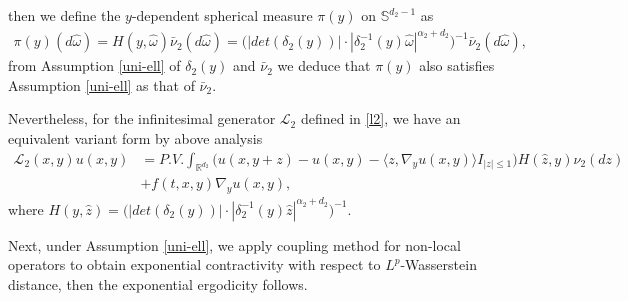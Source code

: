 \documentclass[11pt,reqno]{amsart}
\numberwithin{equation}{section}
\newcommand{\R}{\mathbb{R}}
\newcommand{\s}{\mathbb{S}}
\newcommand{\al}{\alpha}
\newcommand{\om}{\omega}
\newcommand{\ga}{\gamma}
\newcommand{\de}{\delta}
\begin{document}
then we define the $y$-dependent spherical measure $\pi(y)$ on $\s^{d_{2}-1}$ as
\begin{align}\label{pi-H}
	\pi(y)(d\hat{\om})=H(y,\hat{\om})\bar{\nu}_{2}(d\hat{\om})=\big(|det(\de_2(y))|\cdot|\de_2^{-1}(y)\hat{\om}|^{\al_{2}+d_{2}} \big)^{-1}\bar{\nu}_{2}(d\hat{\om}),
\end{align}
from  Assumption \ref{uni-ell} of $\de_2(y)$ and $\bar{\nu}_2$ we deduce that $\pi(y)$ also satisfies Assumption \ref{uni-ell} as that of $\bar{\nu}_{2}$. 

Nevertheless,  for the infinitesimal generator $\mathcal{L}_2$ defined in \eqref{l2}, we have an equivalent variant form by above analysis
\begin{align}\label{l2-2}
	\mathcal{L}_{2}(x,y)u(x,y)
	&=P.V.\int_{\mathbb{R}^{d_{2}}}\Big(u(x,y+z)-u(x,y)-\langle z,\nabla_{y}u(x,y)\rangle I_{|z|\leq1}\Big)H(\hat{z},y)\nu_{2}(dz)\nonumber\\
	&+f(t,x,y)\nabla_{y}u(x,y),
\end{align}
where $H(y,\hat{z})=\big(|det(\de_2(y))|\cdot|\de_2^{-1}(y)\hat{z}|^{\al_{2}+d_{2}} \big)^{-1}.$



Next, under  Assumption \ref{uni-ell},  we apply coupling method for non-local operators to obtain exponential contractivity with respect to $L^p$-Wasserstein distance,  then the exponential ergodicity follows.

\end{document}
